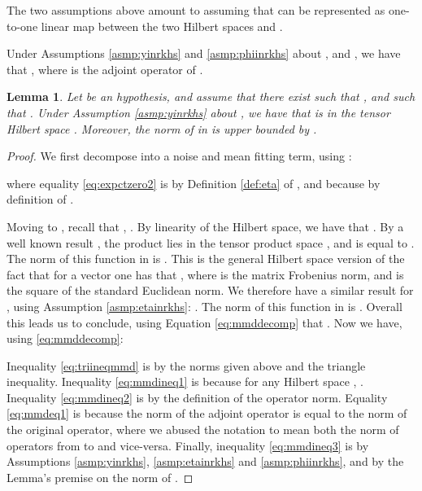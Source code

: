 \documentclass{article}
\newtheorem{thmapplem}{Lemma}
\begin{document}
The two assumptions above amount to assuming that  can be represented as one-to-one linear map between the two Hilbert spaces  and .

Under Assumptions \ref{asmp:yinrkhs} and \ref{asmp:phiinrkhs} about , and , we have that , where  is the adjoint operator of  \cite{grunewalder2013smooth}.


\begin{thmapplem}\label{lem:mmdbound}
Let  be an hypothesis, and assume that there exist  such that , and such that .
Under Assumption \ref{asmp:yinrkhs} about , we have that  is in the tensor Hilbert space . Moreover, the norm of  in  is upper bounded by .
\end{thmapplem}
\begin{proof}
We first decompose  into a noise and mean fitting term, using :

where equality \eqref{eq:expctzero2} is by Definition \ref{def:eta} of , and because  by definition of .

Moving to , recall that , .
By linearity of the Hilbert space, we have that .
By a well known result \citep[Theorem 7.25]{steinwart2008support}, the product  lies in the tensor product space  , and is equal to . The norm of this function in  is . This is the general Hilbert space version of the fact that for a vector  one has that , where  is the matrix Frobenius norm, and  is the square of the standard Euclidean norm.
We therefore have a similar result for , using Assumption \ref{asmp:etainrkhs}: .  
The norm of this function in  is . 
Overall this leads us to conclude, using Equation \eqref{eq:mmddecomp} that .
Now we have, using \eqref{eq:mmddecomp}:

Inequality \eqref{eq:triineqmmd} is by the norms given above and the triangle inequality.
Inequality \eqref{eq:mmdineq1} is because for any Hilbert space , . Inequality \eqref{eq:mmdineq2} is by the definition of the operator norm. Equality \eqref{eq:mmdeq1} is because the norm of the adjoint operator is equal to the norm of the original operator, where we abused the notation  to mean both the norm of operators from  to  and vice-versa. Finally, inequality \eqref{eq:mmdineq3} is by Assumptions \ref{asmp:yinrkhs}, \ref{asmp:etainrkhs} and \ref{asmp:phiinrkhs}, and by the Lemma's premise on the norm of .
\end{proof}
\end{document}
